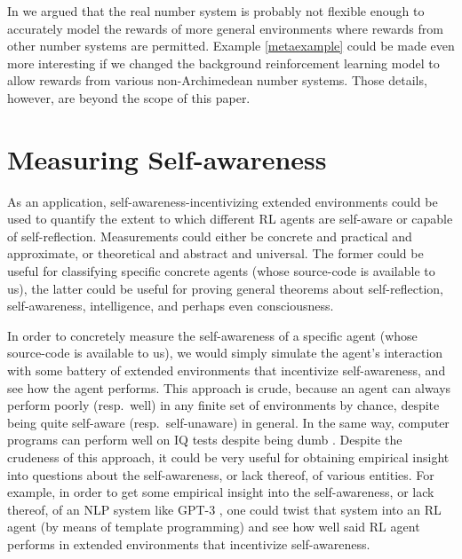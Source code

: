 \documentclass[runningheads]{llncs}
\begin{document}
In \cite{alexander2020archimedean} we argued that the real number system is probably not
flexible enough to accurately model the rewards of more general environments where
rewards from other number systems are permitted.
Example \ref{metaexample} could be made even more interesting if we changed the
background reinforcement learning model to allow rewards from various non-Archimedean
number systems. Those details, however, are beyond the scope of this paper.

\section{Measuring Self-awareness}

As an application, self-awareness-incentivizing extended environments could be used
to quantify the extent to which different RL agents are self-aware or capable
of self-reflection. Measurements could either be concrete and practical and
approximate, or theoretical and abstract and universal. The former could be useful
for classifying specific concrete agents (whose source-code is available to us), the
latter could be useful for proving
general theorems about self-reflection, self-awareness, intelligence, and perhaps
even consciousness.

In order to concretely measure the self-awareness of a specific agent (whose source-code
is available to us), we would simply simulate the agent's interaction with some battery
of extended environments that incentivize self-awareness, and see how the agent performs.
This approach is crude, because an agent can always perform poorly (resp.\ well)
in any finite set of environments by chance, despite being quite
self-aware (resp.\ self-unaware) in general. In the same way, computer programs can
perform well on IQ tests despite being dumb \cite{sanghi2003computer}.
Despite the crudeness of this approach, it could be very useful for obtaining
empirical insight into questions about the self-awareness, or lack thereof, of
various entities. For example, in order to get some empirical insight into the
self-awareness, or lack thereof, of an NLP system like GPT-3
\cite{chalmers}, one could twist that system into an RL agent (by means of template
programming) and see how well said RL agent performs in extended environments that
incentivize self-awareness.
\end{document}

